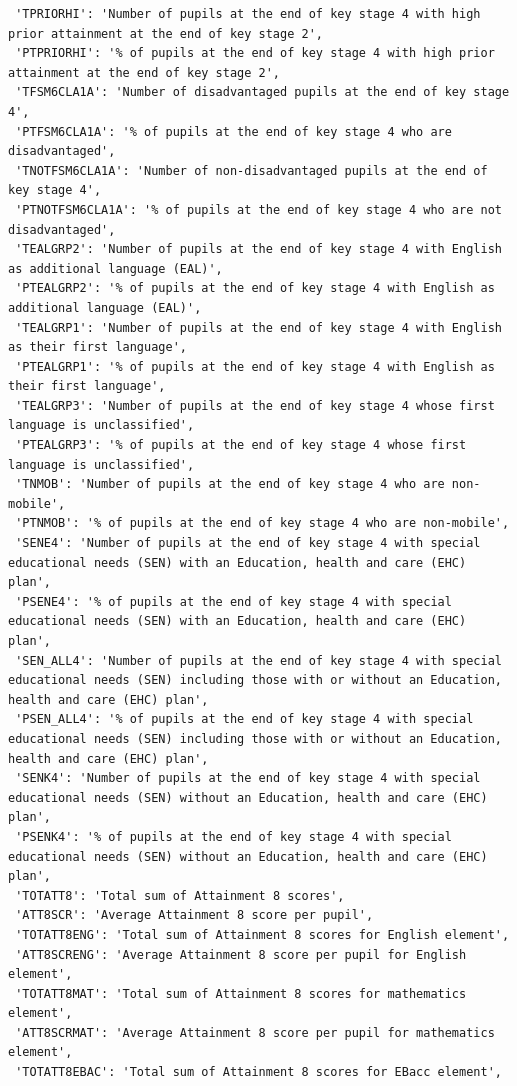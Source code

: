 \documentclass[
  letterpaper,
  DIV=11,
  numbers=noendperiod]{scrartcl}
\begin{document}
\begin{verbatim}
 'TPRIORHI': 'Number of pupils at the end of key stage 4 with high prior attainment at the end of key stage 2',
 'PTPRIORHI': '% of pupils at the end of key stage 4 with high prior attainment at the end of key stage 2',
 'TFSM6CLA1A': 'Number of disadvantaged pupils at the end of key stage 4',
 'PTFSM6CLA1A': '% of pupils at the end of key stage 4 who are disadvantaged',
 'TNOTFSM6CLA1A': 'Number of non-disadvantaged pupils at the end of key stage 4',
 'PTNOTFSM6CLA1A': '% of pupils at the end of key stage 4 who are not disadvantaged',
 'TEALGRP2': 'Number of pupils at the end of key stage 4 with English as additional language (EAL)',
 'PTEALGRP2': '% of pupils at the end of key stage 4 with English as additional language (EAL)',
 'TEALGRP1': 'Number of pupils at the end of key stage 4 with English as their first language',
 'PTEALGRP1': '% of pupils at the end of key stage 4 with English as their first language',
 'TEALGRP3': 'Number of pupils at the end of key stage 4 whose first language is unclassified',
 'PTEALGRP3': '% of pupils at the end of key stage 4 whose first language is unclassified',
 'TNMOB': 'Number of pupils at the end of key stage 4 who are non-mobile',
 'PTNMOB': '% of pupils at the end of key stage 4 who are non-mobile',
 'SENE4': 'Number of pupils at the end of key stage 4 with special educational needs (SEN) with an Education, health and care (EHC) plan',
 'PSENE4': '% of pupils at the end of key stage 4 with special educational needs (SEN) with an Education, health and care (EHC) plan',
 'SEN_ALL4': 'Number of pupils at the end of key stage 4 with special educational needs (SEN) including those with or without an Education, health and care (EHC) plan',
 'PSEN_ALL4': '% of pupils at the end of key stage 4 with special educational needs (SEN) including those with or without an Education, health and care (EHC) plan',
 'SENK4': 'Number of pupils at the end of key stage 4 with special educational needs (SEN) without an Education, health and care (EHC) plan',
 'PSENK4': '% of pupils at the end of key stage 4 with special educational needs (SEN) without an Education, health and care (EHC) plan',
 'TOTATT8': 'Total sum of Attainment 8 scores',
 'ATT8SCR': 'Average Attainment 8 score per pupil',
 'TOTATT8ENG': 'Total sum of Attainment 8 scores for English element',
 'ATT8SCRENG': 'Average Attainment 8 score per pupil for English element',
 'TOTATT8MAT': 'Total sum of Attainment 8 scores for mathematics element',
 'ATT8SCRMAT': 'Average Attainment 8 score per pupil for mathematics element',
 'TOTATT8EBAC': 'Total sum of Attainment 8 scores for EBacc element',

\end{verbatim}
\end{document}

